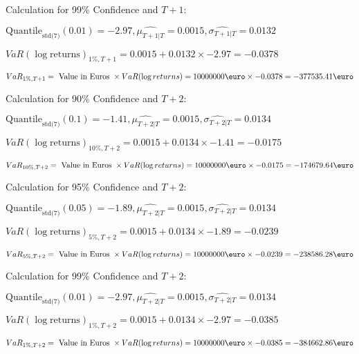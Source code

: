 Calculation for 99\% Confidence and $T+1$:

\indent\indent $\text{Quantile}_\text{std(7)}(0.01) = -2.97,\hat{\mu_{T+1|T}} = 0.0015, \hat{\sigma_{T+1|T}} = 0.0132$

\indent\indent $VaR(\log \text{returns})_{1\%, T + 1} = 0.0015 + 0.0132\times-2.97 = -0.0378$

\indent\indent $VaR_{1\%, T + 1} = \text{ Value in Euros } \times VaR(\log returns) = 10 000 000 \text{\euro} \times-0.0378 = -377535.41 \text{\euro}$\newline




Calculation for 90\% Confidence and $T+2$:

\indent\indent $\text{Quantile}_\text{std(7)}(0.1) = -1.41,\hat{\mu_{T+2|T}} = 0.0015, \hat{\sigma_{T+2|T}} = 0.0134$

\indent\indent $VaR(\log \text{returns})_{10\%, T + 2} = 0.0015 + 0.0134\times-1.41 = -0.0175$

\indent\indent $VaR_{10\%, T + 2} = \text{ Value in Euros } \times VaR(\log returns) = 10 000 000 \text{\euro} \times-0.0175 = -174679.64 \text{\euro}$\newline




Calculation for 95\% Confidence and $T+2$:

\indent\indent $\text{Quantile}_\text{std(7)}(0.05) = -1.89,\hat{\mu_{T+2|T}} = 0.0015, \hat{\sigma_{T+2|T}} = 0.0134$

\indent\indent $VaR(\log \text{returns})_{5\%, T + 2} = 0.0015 + 0.0134\times-1.89 = -0.0239$

\indent\indent $VaR_{5\%, T + 2} = \text{ Value in Euros } \times VaR(\log returns) = 10 000 000 \text{\euro} \times-0.0239 = -238586.28 \text{\euro}$\newline




Calculation for 99\% Confidence and $T+2$:

\indent\indent $\text{Quantile}_\text{std(7)}(0.01) = -2.97,\hat{\mu_{T+2|T}} = 0.0015, \hat{\sigma_{T+2|T}} = 0.0134$

\indent\indent $VaR(\log \text{returns})_{1\%, T + 2} = 0.0015 + 0.0134\times-2.97 = -0.0385$

\indent\indent $VaR_{1\%, T + 2} = \text{ Value in Euros } \times VaR(\log returns) = 10 000 000 \text{\euro} \times-0.0385 = -384662.86 \text{\euro}$\newline




